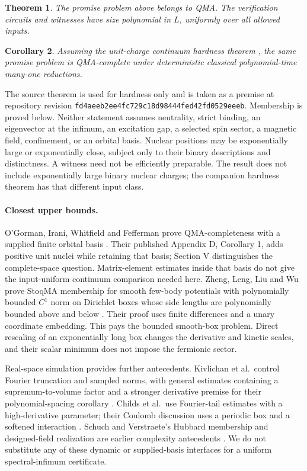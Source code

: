 \documentclass[11pt]{article}
\newtheorem{theorem}{Theorem}
\newtheorem{corollary}[theorem]{Corollary}
\theoremstyle{remark}\newtheorem{remark}[theorem]{Remark}
\numberwithin{equation}{section}
\begin{document}
\begin{theorem}\label{thm:main}
The promise problem above belongs to QMA. The verification circuits and
witnesses have size polynomial in $L$, uniformly over all allowed inputs.
\end{theorem}

\begin{corollary}\label{cor:complete}
Assuming the unit-charge continuum hardness theorem \cite[Theorem 1]{unit},
the same promise problem is QMA-complete under deterministic classical
polynomial-time many-one reductions.
\end{corollary}

The source theorem is used for hardness only and is taken as a premise at
repository revision \texttt{fd4aeeb2ee4fc729c18d98444fed42fd0529eeeb}.
Membership is proved below. Neither statement assumes neutrality, strict
binding, an eigenvector at the infimum, an excitation gap, a selected spin
sector, a magnetic field, confinement, or an orbital basis. Nuclear positions
may be exponentially large or exponentially close, subject only to their
binary descriptions and distinctness. A witness need not be efficiently
preparable. The result does not include exponentially large binary nuclear
charges; the companion hardness theorem \cite{binary} has that different
input class.

\paragraph{Closest upper bounds.}
O'Gorman, Irani, Whitfield and Fefferman prove QMA-completeness with a supplied
finite orbital basis \cite{ogorman}. Their published Appendix D, Corollary 1,
adds positive unit nuclei while retaining that basis; Section V distinguishes
the complete-space question. Matrix-element estimates inside that basis do
not give the input-uniform continuum comparison needed here.
Zheng, Leng, Liu and Wu prove StoqMA membership for smooth few-body potentials
with polynomially bounded $C^1$ norm on Dirichlet boxes whose side lengths are
polynomially bounded above and below \cite[Theorem 3.3]{zheng}. Their proof
uses finite differences and a unary coordinate embedding. This pays the
bounded smooth-box problem. Direct rescaling of an exponentially long box
changes the derivative and kinetic scales, and their scalar minimum does not
impose the fermionic sector.

Real-space simulation provides further antecedents. Kivlichan et al.\ control
Fourier truncation and sampled norms, with general estimates containing a
supremum-to-volume factor and a stronger derivative premise for their
polynomial-spacing corollary \cite[Theorem 4, Corollary 5, Lemmas 9--15]{kiv}.
Childs et al.\ use Fourier-tail estimates with a high-derivative parameter;
their Coulomb discussion uses a periodic box and a softened interaction
\cite[Sections 2.2, 2.5 and Appendix B]{childs}. Schuch and Verstraete's
Hubbard membership and designed-field realization are earlier complexity
antecedents \cite{sv}. We do not substitute any of these dynamic or
supplied-basis interfaces for a uniform spectral-infimum certificate.
\end{document}
